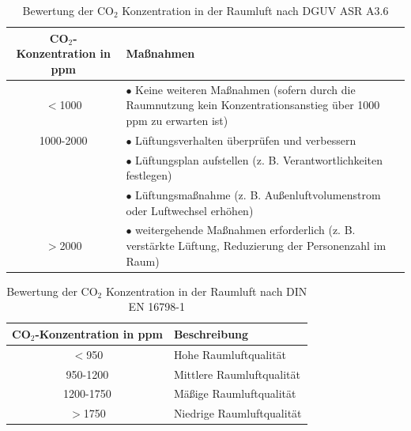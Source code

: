 \documentclass[a4paper,
    11pt,
    headings=small,
    ngerman,
    listof=totoc,
    numbers=noenddot]{scrreprt}[2021/11/13]
\begin{document}
\newpage

\listoffigures
\listoftables
\lstlistoflistings
\printglossary
\printbibliography

\newpage

\appendix
{}

\tableofcontents
\listoffigures
\listoftables
\lstlistoflistings


\begin{table}[htbp]
  \centering
  \renewcommand{\arraystretch}{1.25}
  \caption{Bewertung der CO$_2$ Konzentration in der Raumluft nach \ac{DGUV} \ac{ASR} A3.6 \autocite{ASR}}
  \begin{tabular}{c|p{}}
    CO$_2$-Konzentration in \ac{ppm} &  Maßnahmen                               \\
    \hline
    $<$1000 &  $\bullet$ Keine weiteren Maßnahmen (sofern durch die Raumnutzung kein Konzentrationsanstieg über 1000 ppm zu erwarten ist) \\
    \hline
    1000-2000 & $\bullet$ Lüftungsverhalten überprüfen und verbessern \\
              & $\bullet$ Lüftungsplan aufstellen (z. B. Verantwortlichkeiten festlegen) \\
              & $\bullet$ Lüftungsmaßnahme (z. B. Außenluftvolumenstrom oder Luftwechsel erhöhen) \\
    \hline
    $>$2000 &  $\bullet$ weitergehende Maßnahmen erforderlich (z. B. verstärkte Lüftung, Reduzierung der Personenzahl im Raum) \\
  \end{tabular}
  \label{appendix:tab:dguv_table_co2}
\end{table}

\begin{table}[htbp]
  \centering
  \renewcommand{\arraystretch}{1.25}
  \caption{Bewertung der CO$_2$ Konzentration in der Raumluft nach DIN EN 16798-1 \autocite{din_en_16798}}
  \begin{tabular}{c|p{}}
    CO$_2$-Konzentration in \ac{ppm} & Beschreibung   \\
    \hline
    $<$950 & Hohe Raumluftqualität \\
    950-1200 & Mittlere Raumluftqualität \\
    1200-1750 & Mäßige Raumluftqualität \\
    $>$1750 & Niedrige Raumluftqualität\\
  \end{tabular}
  \label{appendix:tab:din_table_co2}
\end{table}
\end{document}
